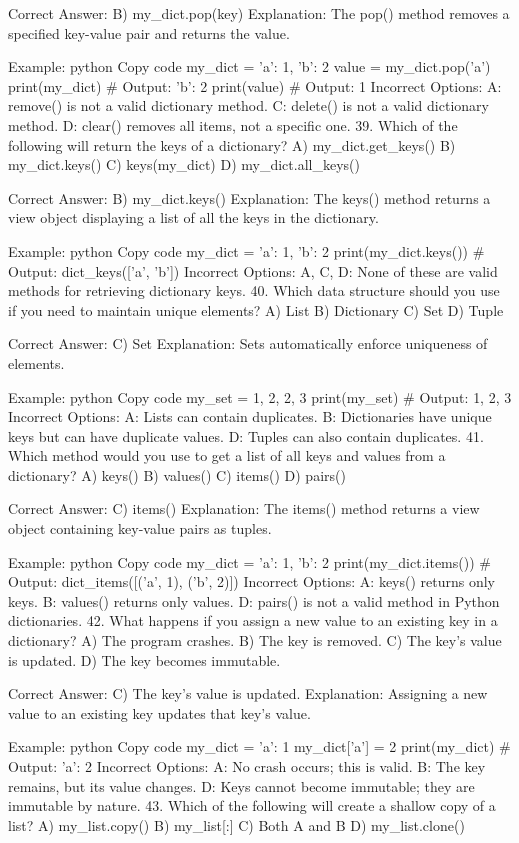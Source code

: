 Correct Answer: B) my_dict.pop(key)
Explanation: The pop() method removes a specified key-value pair and returns the value.

Example:
python
Copy code
my_dict = {'a': 1, 'b': 2}
value = my_dict.pop('a')
print(my_dict)  # Output: {'b': 2}
print(value)    # Output: 1
Incorrect Options:
A: remove() is not a valid dictionary method.
C: delete() is not a valid dictionary method.
D: clear() removes all items, not a specific one.
39. Which of the following will return the keys of a dictionary?
A) my_dict.get_keys()
B) my_dict.keys()
C) keys(my_dict)
D) my_dict.all_keys()

Correct Answer: B) my_dict.keys()
Explanation: The keys() method returns a view object displaying a list of all the keys in the dictionary.

Example:
python
Copy code
my_dict = {'a': 1, 'b': 2}
print(my_dict.keys())  # Output: dict_keys(['a', 'b'])
Incorrect Options:
A, C, D: None of these are valid methods for retrieving dictionary keys.
40. Which data structure should you use if you need to maintain unique elements?
A) List
B) Dictionary
C) Set
D) Tuple

Correct Answer: C) Set
Explanation: Sets automatically enforce uniqueness of elements.

Example:
python
Copy code
my_set = {1, 2, 2, 3}
print(my_set)  # Output: {1, 2, 3}
Incorrect Options:
A: Lists can contain duplicates.
B: Dictionaries have unique keys but can have duplicate values.
D: Tuples can also contain duplicates.
41. Which method would you use to get a list of all keys and values from a dictionary?
A) keys()
B) values()
C) items()
D) pairs()

Correct Answer: C) items()
Explanation: The items() method returns a view object containing key-value pairs as tuples.

Example:
python
Copy code
my_dict = {'a': 1, 'b': 2}
print(my_dict.items())  # Output: dict_items([('a', 1), ('b', 2)])
Incorrect Options:
A: keys() returns only keys.
B: values() returns only values.
D: pairs() is not a valid method in Python dictionaries.
42. What happens if you assign a new value to an existing key in a dictionary?
A) The program crashes.
B) The key is removed.
C) The key's value is updated.
D) The key becomes immutable.

Correct Answer: C) The key's value is updated.
Explanation: Assigning a new value to an existing key updates that key's value.

Example:
python
Copy code
my_dict = {'a': 1}
my_dict['a'] = 2
print(my_dict)  # Output: {'a': 2}
Incorrect Options:
A: No crash occurs; this is valid.
B: The key remains, but its value changes.
D: Keys cannot become immutable; they are immutable by nature.
43. Which of the following will create a shallow copy of a list?
A) my_list.copy()
B) my_list[:]
C) Both A and B
D) my_list.clone()

